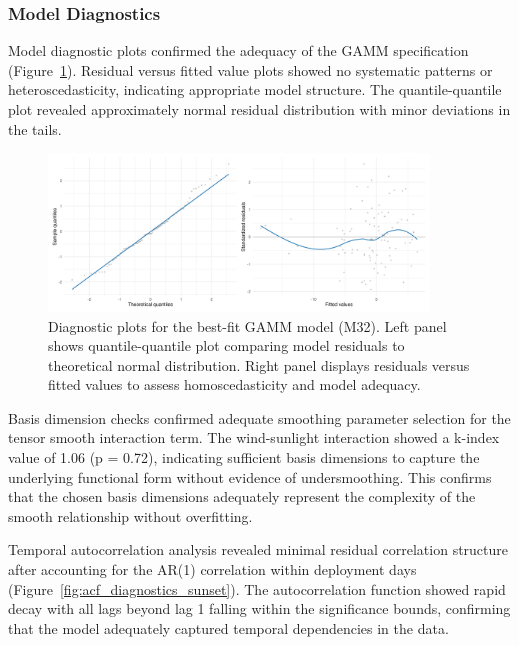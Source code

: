 \subsubsection{Model Diagnostics}

Model diagnostic plots confirmed the adequacy of the GAMM specification (Figure~\ref{fig:model_diagnostics_sunset}). Residual versus fitted value plots showed no systematic patterns or heteroscedasticity, indicating appropriate model structure. The quantile-quantile plot revealed approximately normal residual distribution with minor deviations in the tails.

\begin{figure}[htbp]
    \centering
    \includegraphics[width=0.9\textwidth]{supplemental/results/sunset/figures/diag_qq_and_residuals_1x2.png}
    \caption{Diagnostic plots for the best-fit GAMM model (M32). Left panel shows quantile-quantile plot comparing model residuals to theoretical normal distribution. Right panel displays residuals versus fitted values to assess homoscedasticity and model adequacy.}
    \label{fig:model_diagnostics_sunset}
\end{figure}

Basis dimension checks confirmed adequate smoothing parameter selection for the tensor smooth interaction term. The wind-sunlight interaction showed a k-index value of 1.06 (p = 0.72), indicating sufficient basis dimensions to capture the underlying functional form without evidence of undersmoothing. This confirms that the chosen basis dimensions adequately represent the complexity of the smooth relationship without overfitting.

Temporal autocorrelation analysis revealed minimal residual correlation structure after accounting for the AR(1) correlation within deployment days (Figure~\ref{fig:acf_diagnostics_sunset}). The autocorrelation function showed rapid decay with all lags beyond lag 1 falling within the significance bounds, confirming that the model adequately captured temporal dependencies in the data. 

